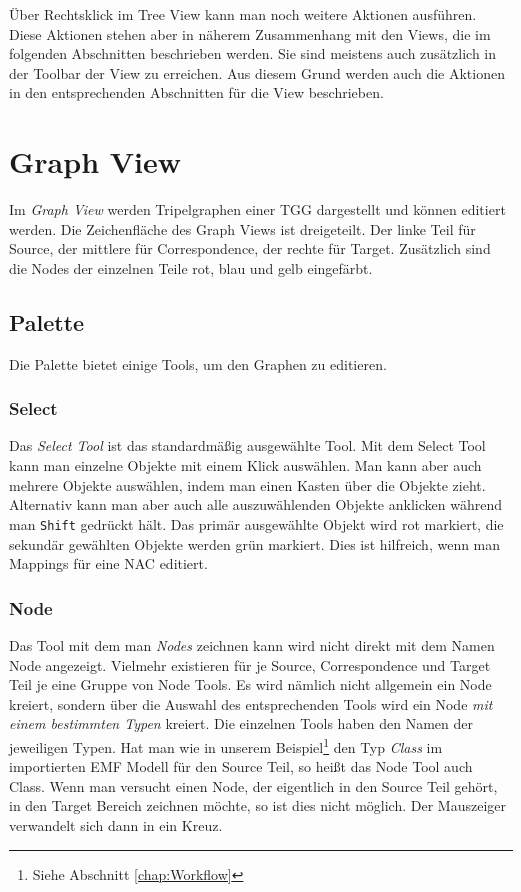 Über Rechtsklick im Tree View kann man noch weitere Aktionen ausführen. Diese Aktionen stehen aber in näherem Zusammenhang mit den Views, die im folgenden Abschnitten beschrieben werden. Sie sind meistens auch zusätzlich in der Toolbar der View zu erreichen. Aus diesem Grund werden auch die Aktionen in den entsprechenden Abschnitten für die View beschrieben.

\section{Graph View}
Im \emph{Graph View} werden Tripelgraphen einer TGG dargestellt und können editiert werden. Die Zeichenfläche des Graph Views ist dreigeteilt. Der linke Teil für Source, der mittlere für Correspondence, der rechte für Target. Zusätzlich sind die Nodes der einzelnen Teile rot, blau und gelb eingefärbt.

\subsection{Palette}
Die Palette bietet einige Tools, um den Graphen zu editieren.

\subsubsection{Select}
\label{subsubsec:Graph_View-Select}
Das \emph{Select Tool} ist das standardmäßig ausgewählte Tool. Mit dem Select Tool kann man einzelne Objekte mit einem Klick auswählen. Man kann aber auch mehrere Objekte auswählen, indem man einen Kasten über die Objekte zieht. Alternativ kann man aber auch alle auszuwählenden Objekte anklicken während man \texttt{Shift} gedrückt hält. Das primär ausgewählte Objekt wird rot markiert, die sekundär gewählten Objekte werden grün markiert. Dies ist hilfreich, wenn man Mappings für eine NAC editiert.

\subsubsection{Node}
\label{subsubsec:Graph_View-Node}
Das Tool mit dem man \emph{Nodes} zeichnen kann wird nicht direkt mit dem Namen Node angezeigt. Vielmehr existieren für je Source, Correspondence und Target Teil je eine Gruppe von Node Tools. Es wird nämlich nicht allgemein ein Node kreiert, sondern über die Auswahl des entsprechenden Tools wird ein Node \textit{mit einem bestimmten Typen} kreiert. Die einzelnen Tools haben den Namen der jeweiligen Typen. Hat man wie in unserem Beispiel\footnote{Siehe Abschnitt \ref{chap:Workflow}} den Typ \emph{Class} im importierten EMF Modell für den Source Teil, so heißt das Node Tool auch Class. Wenn man versucht einen Node, der eigentlich in den Source Teil gehört, in den Target Bereich zeichnen möchte, so ist dies nicht möglich. Der Mauszeiger verwandelt sich dann in ein Kreuz.

